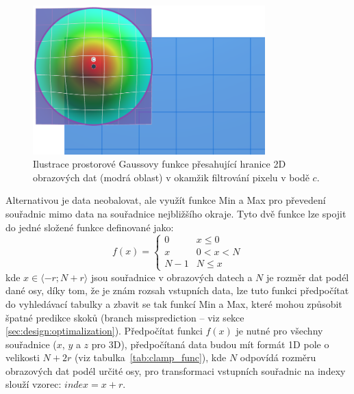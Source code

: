 \begin{figure} [H]
    \centering
    \label{fig:bf:gauss_out_of_image_bounds}
    \includegraphics[width=0.80\textwidth]{figures/bf-gauss-out-of-bounds.png}
    \caption{Ilustrace prostorové Gaussovy funkce přesahující hranice 2D obrazových dat (modrá oblast) v okamžik filtrování pixelu v bodě $c$.}
\end{figure}

Alternativou je data neobalovat, ale využít funkce Min a Max pro převedení souřadnic mimo data na souřadnice nejbližšího okraje. Tyto dvě funkce lze spojit do jedné složené funkce definované jako:
\begin{equation*}
    f(x) =
        \begin{cases} 
            0 & x\leq 0 \\
            x & 0<x<N \\
            N-1 & N\leq x 
       \end{cases}
\end{equation*}
kde $x\in\langle-r;N+r\rangle$ jsou souřadnice v obrazových datech a $N$ je rozměr dat podél dané osy, díky tom, že je znám rozsah vstupních data, lze tuto funkci předpočítat do vyhledávací tabulky a zbavit se tak funkcí Min a Max, které mohou způsobit špatné predikce skoků (branch missprediction -- viz sekce \ref{sec:design:optimalization}). Předpočítat funkci $f(x)$ je nutné pro všechny souřadnice ($x$, $y$ a $z$ pro 3D), předpočítaná data budou mít formát 1D pole o velikosti $N + 2r$ (viz tabulka~\ref{tab:clamp_func}), kde $N$ odpovídá rozměru obrazových dat podél určité osy, pro transformaci vstupních souřadnic na indexy slouží vzorec: $index = x + r$. 

